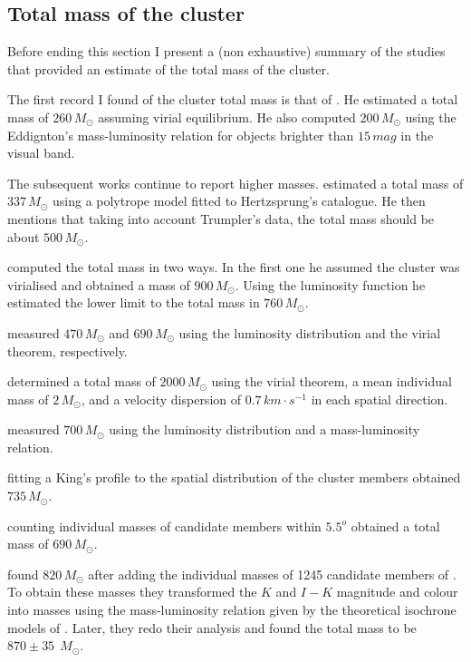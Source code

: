 \subsection{Total mass of the cluster}
Before ending this section I present a (non exhaustive) summary of the studies that provided an estimate of the total mass of the cluster.

The first record I found of the cluster total mass is that of \citet{1938AJ.....47...25T}. He estimated a total mass of $260 \,M_{\odot}$ assuming virial equilibrium. He also computed $200 \,M_{\odot}$ using the Eddignton's mass-luminosity relation for objects brighter than $15 \,mag$ in the visual band.

The subsequent works continue to report higher masses. \citet{1956MNRAS.116..296W} estimated a total mass of $337 \,M_{\odot}$ using a polytrope model fitted to Hertzsprung's catalogue. He then mentions that taking into account Trumpler's data, the total mass should be about $500\,M_{\odot}$. 

\citet{Limber1962} computed the total mass in two ways. In the first one he assumed the cluster was virialised and obtained a mass of $900 \,M_{\odot}$. Using the luminosity function he estimated the lower limit to the total mass in $760 \,M_{\odot}$. 

\citet{1970AJ.....75..563J} measured $470\,M_{\odot}$ and $690\,M_{\odot}$ using the luminosity distribution and the virial theorem, respectively. 

\citet{1980IAUS...85..157V}  determined a total mass of $2000 \,M_{\odot}$ using the virial theorem, a mean individual mass of $2\,M_{\odot}$, and a velocity dispersion of $0.7\,km \cdot s^{-1}$ in each spatial direction. 

\citet{1995JKAS...28...45L} measured $700 \,M_{\odot}$ using the luminosity distribution and a mass-luminosity relation. 

\citet{Pinfield1998} fitting a King's profile to the spatial distribution of the cluster members obtained $735\,M_{\odot}$. 

\citet{Adams2001} counting individual masses of candidate members within $5.5^o$ obtained a total mass of $690 \,M_{\odot}$. 

\citet{Converse2008} found $820 \,M_{\odot}$ after adding the individual masses of 1245  candidate members of \citet{Stauffer2007}. To obtain these masses they  transformed the $K$ and $I-K$ magnitude and colour into masses using the mass-luminosity relation given by the theoretical isochrone models of \citet{1998A&A...337..403B}. Later, \citet{Converse2010} they redo their analysis and found the total mass to be $870\pm35\ \ M_{\odot}$.

